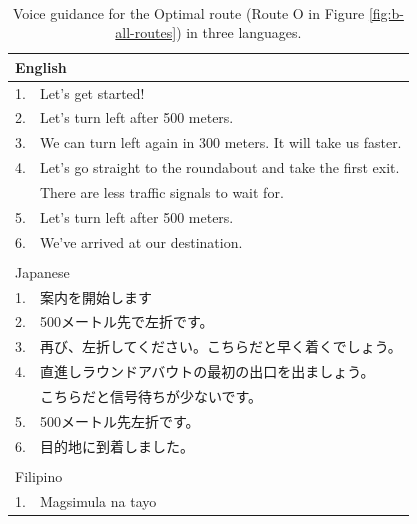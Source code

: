 \begin{table}[h]
\centering
\caption{Voice guidance for the Optimal route (Route O in Figure \ref{fig:b-all-routes}) in three languages.}~\label{tab:b-optimal-pure}
\begin{tabular}{ll}
\hline
\multicolumn{2}{l}{English}                                        \\ \hline
1. & Let's get started!                                            \\
2. & Let's turn left after 500 meters.                             \\
3. & We can turn left again in 300 meters. It will take us faster. \\
4. & Let's go straight to the roundabout and take the first exit.  \\
   & There are less traffic signals to wait for.                   \\
5. & Let's turn left after 500 meters.                             \\
6. & We've arrived at our destination.                             \\ \hline
   &                                                               \\ \hline
\multicolumn{2}{l}{Japanese}                                       \\ \hline
1. & 案内を開始します                                                      \\
2. & 500メートル先で左折です。                                                \\
3. & 再び、左折してください。こちらだと早く着くでしょう。                                    \\
4. & 直進しラウンドアバウトの最初の出口を出ましょう。                                      \\
   & こちらだと信号待ちが少ないです。                                              \\
5. & 500メートル先左折です。                                                 \\
6. & 目的地に到着しました。                                                   \\ \hline
   &                                                               \\ \hline
\multicolumn{2}{l}{Filipino}                                       \\ \hline
1. & Magsimula na tayo                                             \\

\end{tabular}
\end{table}
